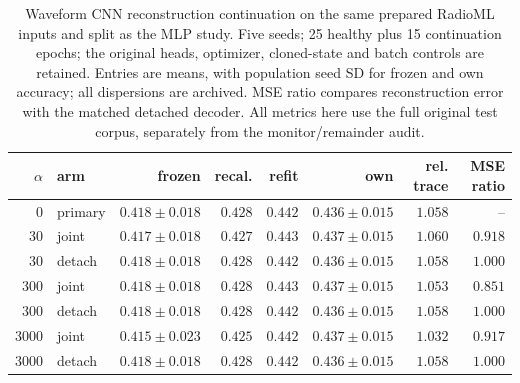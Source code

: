 \begin{table}[t]
\centering
\caption{Waveform CNN reconstruction continuation on the same prepared RadioML inputs and split as the MLP study. Five seeds; 25 healthy plus 15 continuation epochs; the original heads, optimizer, cloned-state and batch controls are retained. Entries are means, with population seed SD for frozen and own accuracy; all dispersions are archived. MSE ratio compares reconstruction error with the matched detached decoder. All metrics here use the full original test corpus, separately from the monitor/remainder audit.}
\label{tab:cnn_continuation}
\footnotesize
\begin{tabular}{rlrrrrrr}
\toprule
$\alpha$ & arm & frozen & recal. & refit & own & rel. trace & MSE ratio \\
\midrule
0 & primary & $0.418\pm0.018$ & $0.428$ & $0.442$ & $0.436\pm0.015$ & $1.058$ & -- \\
30 & joint & $0.417\pm0.018$ & $0.427$ & $0.443$ & $0.437\pm0.015$ & $1.060$ & $0.918$ \\
30 & detach & $0.418\pm0.018$ & $0.428$ & $0.442$ & $0.436\pm0.015$ & $1.058$ & $1.000$ \\
300 & joint & $0.418\pm0.018$ & $0.428$ & $0.443$ & $0.437\pm0.015$ & $1.053$ & $0.851$ \\
300 & detach & $0.418\pm0.018$ & $0.428$ & $0.442$ & $0.436\pm0.015$ & $1.058$ & $1.000$ \\
3000 & joint & $0.415\pm0.023$ & $0.425$ & $0.442$ & $0.437\pm0.015$ & $1.032$ & $0.917$ \\
3000 & detach & $0.418\pm0.018$ & $0.428$ & $0.442$ & $0.436\pm0.015$ & $1.058$ & $1.000$ \\
\bottomrule
\end{tabular}
\end{table}
